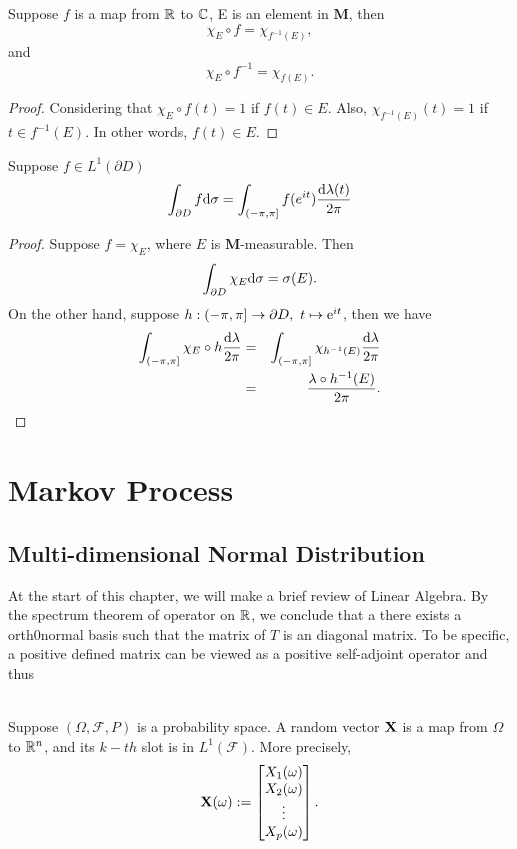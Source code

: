 \documentclass[12pt]{book}
\begin{document}
\begin{lemma}
Suppose $f$ is a map from $\mathbb{R}$ to $\mathbb{C}$, E is an element in $\mathbf{M}$, then
$$
\chi_E \circ f = \chi_{f^{-1}(E)},
$$
and
$$
\chi_E \circ f^{-1} = \chi_{f(E)}.
$$
\begin{proof}
	Considering that $\chi_E \circ f (t)=1$ if $f(t)\in E$. Also, $\chi_{f^{-1}(E)}(t)=1$ if $t\in f^{-1}(E)$. In other words, $f(t) \in E$.
\end{proof}
\end{lemma}

\begin{theorem}
Suppose $f \in L^1(\partial D)$
	$$
	\int_{\partial D}f\mathrm{d} \sigma = \int_{(-\pi,\pi]}f(e^{it}) \frac{\mathrm{d} \lambda(t)}{2\pi}
	$$
\end{theorem}
\begin{proof}
Suppose $f=\chi_E$, where $E$ is $\mathbf{M}$-measurable. Then
$$
\int_{\partial D} \chi_E \mathrm{d} \sigma = \sigma(E).
$$ 
On the other hand, suppose $h:(-\pi,\pi] \to \partial D,\ t\mapsto \mathrm{e}^{it}$, then we have
\begin{eqnarray*}
	\int_{(-\pi,\pi]} \chi_E \circ h \frac{\mathrm{d} \lambda}{2\pi} &=& \int_{(-\pi,\pi]}\chi_{h^{-1}(E)} \frac{\mathrm{d} \lambda}{2\pi} \\
	&=& \frac{\lambda \circ h^{-1}(E)}{2\pi}.
\end{eqnarray*}
\end{proof}




\begin{remark}
	
\end{remark}



\chapter{Markov Process}
\section{Multi-dimensional Normal Distribution}
At the start of this chapter, we will make a brief review of Linear Algebra. By the spectrum theorem of operator on $\mathbb{R}$, we conclude that a there exists a orth0normal basis such that the matrix of $T$ is an diagonal matrix. To be specific, a positive defined matrix can be viewed as a positive self-adjoint operator and thus 
\begin{definition} \ \\
Suppose $(\Omega,\mathcal{F},P)$ is a probability space. A random vector $\mathbf{X}$ is a map from $\Omega$ to $\mathbb{R}^n$, and its $k-th$ slot is in $L^1(\mathcal{F})$. More precisely,
$$
\mathbf{X}(\omega) := \begin{bmatrix}
	X_1(\omega) \\
	X_2(\omega) \\
	\vdots \\
	X_p(\omega)
\end{bmatrix}.
$$
\end{definition}
\end{document}
